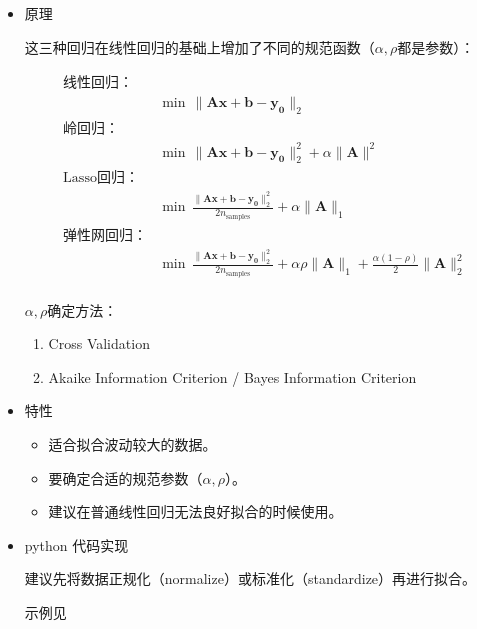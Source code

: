 \documentclass{article}
\begin{document}
\begin{itemize}

\item{原理}

这三种回归在线性回归的基础上增加了不同的规范函数（$\alpha,\rho$都是参数）：

\begin{equation}
    \begin{split}
        \text{线性回归：} &\\
        &\min\,\lVert \mathbf{Ax + b - y_0}\rVert_2\\
        \text{岭回归：} &\\
        &\min\,\lVert \mathbf{Ax + b - y_0}\rVert_2^2 + \alpha \lVert \mathbf{A} \rVert^2\\
        \text{Lasso回归：} &\\
        &\min\, \frac{\lVert \mathbf{Ax + b - y_0}\rVert_2^2}{2n_{\text{samples}}} + \alpha \lVert \mathbf{A} \rVert_1\\
        \text{弹性网回归：} &\\
        &\min\, \frac{\lVert \mathbf{Ax + b - y_0}\rVert_2^2}{2n_{\text{samples}}} + \alpha\rho\lVert\mathbf{A}\rVert_1 + \frac{\alpha(1 - \rho)}{2} \lVert \mathbf{A} \rVert_2^2\\
    \end{split}
\end{equation}

$\alpha, \rho$确定方法：
\begin{enumerate}
    \item Cross Validation
    \item Akaike Information Criterion / Bayes Information Criterion
\end{enumerate}

\item{特性}

\begin{itemize}
    \item  适合拟合波动较大的数据。
    \item  要确定合适的规范参数（$\alpha, \rho$）。
    \item  建议在普通线性回归无法良好拟合的时候使用。
\end{itemize}

\item{python 代码实现}

建议先将数据正规化（normalize）或标准化（standardize）再进行拟合。

示例见\\
\\
\\

\end{itemize}
\end{document}
